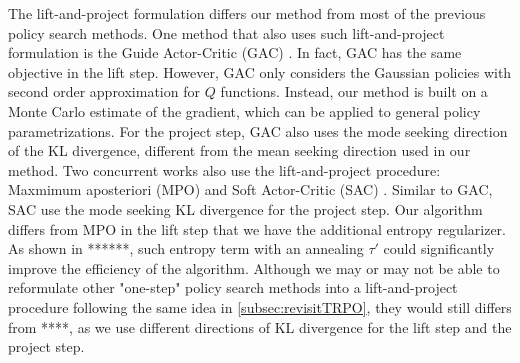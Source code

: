 The lift-and-project formulation differs our method from most of the previous policy search methods. 
One method that also uses such lift-and-project formulation is the Guide Actor-Critic (GAC) \citet{tangkaratt2017guide}. In fact, GAC has the same objective in the lift step. 
However, GAC only considers the Gaussian policies with second order approximation for $Q$ functions.
Instead, our method is built on a Monte Carlo estimate of the gradient, which can be applied to general policy parametrizations. For the project step, GAC also uses the mode seeking direction of the KL divergence, different from the mean seeking direction used in our method.  
Two concurrent works also use the lift-and-project procedure: Maxmimum aposteriori (MPO) and Soft Actor-Critic (SAC) \citep{abdolmaleki2018maximum,haarnoja2018soft}. 
Similar to GAC, SAC use the mode seeking KL divergence for the project step. 
Our algorithm differs from MPO in the lift step that we have the additional entropy regularizer. 
As shown in ******, such entropy term with an annealing $\tau'$ could significantly improve the efficiency of the algorithm.
Although we may or may not be able to reformulate other "one-step" policy search methods into a lift-and-project procedure following the same idea in \cref{subsec:revisitTRPO},
they would still differs from ****, as we use different directions of KL divergence for the lift step and the project step. 


